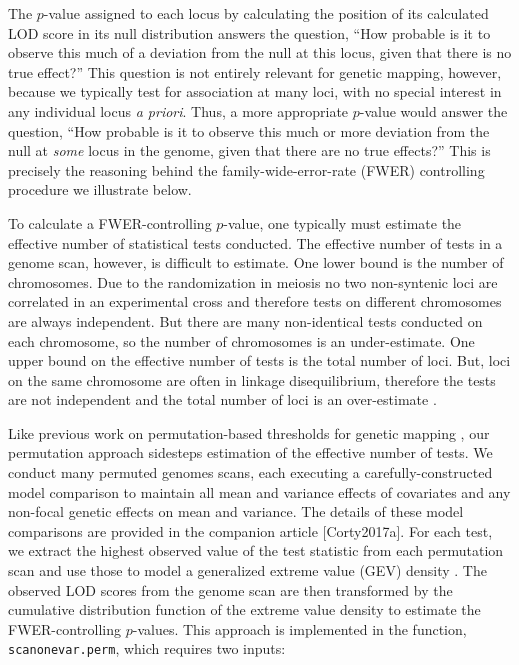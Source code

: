 \documentclass{article}
\begin{document}
The $p$-value assigned to each locus by calculating the position of its calculated LOD score in its null distribution answers the question, ``How probable is it to observe this much of a deviation from the null at this locus, given that there is no true effect?''
This question is not entirely relevant for genetic mapping, however, because we typically test for association at many loci, with no special interest in any individual locus \textit{a priori}.
Thus, a more appropriate $p$-value would answer the question, ``How probable is it to observe this much or more deviation from the null at \textit{some} locus in the genome, given that there are no true effects?''
This is precisely the reasoning behind the family-wide-error-rate (FWER) controlling procedure we illustrate below.

To calculate a FWER-controlling $p$-value, one typically must estimate the effective number of statistical tests conducted.
The effective number of tests in a genome scan, however, is difficult to estimate.
One lower bound is the number of chromosomes.
Due to the randomization in meiosis no two non-syntenic loci are correlated in an experimental cross and therefore tests on different chromosomes are always independent.
But there are many non-identical tests conducted on each chromosome, so the number of chromosomes is an under-estimate.
One upper bound on the effective number of tests is the total number of loci.
But, loci on the same chromosome are often in linkage disequilibrium, therefore the tests are not independent and the total number of loci is an over-estimate \citep{Lander1989a}.

Like previous work on permutation-based thresholds for genetic mapping \citep{Churchill1994,Carlborg2002}, our permutation approach sidesteps estimation of the effective number of tests.
We conduct many permuted genomes scans, each executing a carefully-constructed model comparison to maintain all mean and variance effects of covariates and any non-focal genetic effects on mean and variance.
The details of these model comparisons are provided in the companion article [Corty2017a].
For each test, we extract the highest observed value of the test statistic from each permutation scan and use those to model a generalized extreme value (GEV) density \citep{Stephenson2002}.
The observed LOD scores from the genome scan are then transformed by the cumulative distribution function of the extreme value density to estimate the FWER-controlling $p$-values.
This approach is implemented in the function, \texttt{scanonevar.perm}, which requires two inputs:
\end{document}
